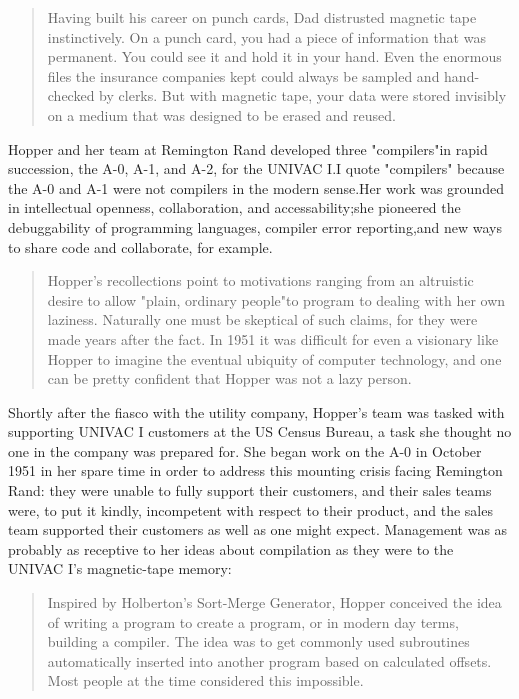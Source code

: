 \begin{quotation}
  Having built his career on punch cards, Dad distrusted magnetic
  tape instinctively. On a punch card, you had a piece of information that
  was permanent. You could see it and hold it in your hand. Even the enormous files
  the insurance companies kept could always be sampled and hand-checked
  by clerks. But with magnetic tape, your data were stored invisibly on a
  medium that was designed to be erased and
  reused.\cite{grace_hopper_and_the_invention_of_the_information_age_2009}
\end{quotation}
Hopper and her team at Remington Rand developed three "compilers"in rapid
succession, the A-0, A-1, and A-2, for the UNIVAC I.I quote "compilers" because
the A-0 and A-1 were not compilers in the modern sense.Her work was grounded in
intellectual openness, collaboration, and accessability;she pioneered the
debuggability of programming languages, compiler error reporting,and new ways
to share code and collaborate, for example.
\begin{quotation}
  Hopper's recollections point to motivations ranging from an altruistic
  desire to allow "plain, ordinary people"to program to dealing with her own
  laziness. Naturally one must be skeptical of such claims, for they were made
  years after the fact. In 1951 it was difficult for even a visionary like Hopper
  to imagine the eventual ubiquity of computer technology, and one can be pretty
  confident that Hopper was not a lazy person.
  \cite{grace_hopper_and_the_invention_of_the_information_age_2009}
\end{quotation}
Shortly after the fiasco with the utility company, Hopper's team was tasked
with supporting UNIVAC I customers at the US Census Bureau, a task she thought
no one in the company was prepared for. She began work on the A-0 in October
1951 in her spare time in order to address this mounting crisis facing
Remington Rand: they were unable to fully support their customers, and their
sales teams were, to put it kindly, incompetent with respect to their product,
and the sales team supported their customers as well as one might expect.
Management was as probably as receptive to her ideas about compilation as they
were to the UNIVAC I's magnetic-tape memory:

\begin{quotation}
  Inspired by Holberton's Sort-Merge Generator, Hopper conceived the
  idea of writing a
  program to create a program, or in modern day terms, building a compiler.
  The idea was to get commonly used subroutines automatically
  inserted into another program based on calculated offsets.
  Most people at the time considered this impossible.
  \cite{women_in_computing_history_2002}
\end{quotation}

